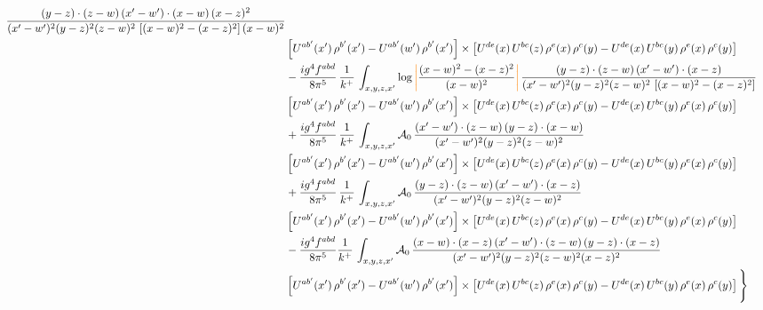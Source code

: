 \documentclass[9pt]{article}
\numberwithin{equation}{section}
\begin{document}
\begin{align}
\frac{(y-z)\cdot(z-w)\,(x'-w')\cdot(x-w)\,(x-z)^{2}}{(x'-w')^{2}(y-z)^{2}(z-w)^{2}\,\left[(x-w)^{2}-(x-z)^{2}\right](x-w)^{2}}\notag \\ 
& \left[U^{ab'}(x')\,\rho^{b'}(x')-U^{ab'}(w')\, \rho^{b'}(x')\right]\times \left[U^{de}(x)\,U^{bc}(z)\, \rho^{e}(x)\,\rho^{c}(y)-U^{de}(x)\,U^{bc}(y)\,\rho^{e}(x)\,\rho^{c}(y)\right] \notag \\
& -\frac{ig^{4}f^{abd}}{8\pi^{5}}\,\frac{1}{k^{+}}\,\int_{x,y,z,x'}\log{\textcolor{orange}{\left|\textcolor{black}{\frac{(x-w)^{2}-(x-z)^{2}}{(x-w)^{2}}}\right|}}\,
\frac{(y-z)\cdot(z-w)\,(x'-w')\cdot(x-z)}{(x'-w')^{2}(y-z)^{2}(z-w)^{2}\,\left[(x-w)^{2}-(x-z)^{2}\right]}\notag \\ & \left[U^{ab'}(x')\,\rho^{b'}(x')-U^{ab'}(w')\, \rho^{b'}(x')\right]\times \left[U^{de}(x)\,U^{bc}(z)\, \rho^{e}(x)\,\rho^{c}(y)-U^{de}(x)\,U^{bc}(y)\,\rho^{e}(x)\,\rho^{c}(y)\right] \notag \\
& +\frac{ig^{4}f^{abd}}{8\pi^{5}}\,\frac{1}{k^{+}}\,\int_{x,y,z,x'}\mathcal{A}_{0}\,
\frac{(x'-w')\cdot(z-w)\,(y-z)\cdot(x-w)}{(x'-w')^{2}(y-z)^{2}(z-w)^{2}}\notag \\
& \left[U^{ab'}(x')\,\rho^{b'}(x')-U^{ab'}(w')\, \rho^{b'}(x')\right]\times \left[U^{de}(x)\,U^{bc}(z)\, \rho^{e}(x)\,\rho^{c}(y)-U^{de}(x)\,U^{bc}(y)\,\rho^{e}(x)\,\rho^{c}(y)\right] \notag \\
& +\frac{ig^{4}f^{abd}}{8\pi^{5}}\,\frac{1}{k^{+}}\,\int_{x,y,z,x'}\mathcal{A}_{0}\,
\frac{(y-z)\cdot(z-w)\,(x'-w')\cdot(x-z)}{(x'-w')^{2}(y-z)^{2}(z-w)^{2}}\notag \\ & \left[U^{ab'}(x')\,\rho^{b'}(x')-U^{ab'}(w')\, \rho^{b'}(x')\right]\times \left[U^{de}(x)\,U^{bc}(z)\, \rho^{e}(x)\,\rho^{c}(y)-U^{de}(x)\,U^{bc}(y)\,\rho^{e}(x)\,\rho^{c}(y)\right] \notag \\
& -\frac{ig^{4}f^{abd}}{8\pi^{5}}\frac{1}{k^{+}}\,\int_{x,y,z,x'}\mathcal{A}_{0}\,
\frac{(x-w)\cdot(x-z)\,(x'-w')\cdot(z-w)\,(y-z)\cdot(x-z)}{(x'-w')^{2}(y-z)^{2}(z-w)^{2}(x-z)^{2}}\notag \\ & \left[U^{ab'}(x')\,\rho^{b'}(x')-U^{ab'}(w')\, \rho^{b'}(x')\right]\times \left[U^{de}(x)\,U^{bc}(z)\, \rho^{e}(x)\,\rho^{c}(y)-U^{de}(x)\,U^{bc}(y)\,\rho^{e}(x)\,\rho^{c}(y)\right]\Bigg\}
\end{align}
\end{document}
